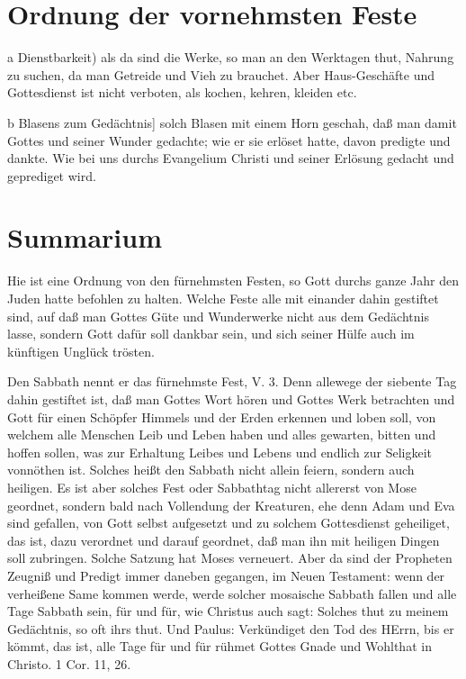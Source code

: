 \section{Ordnung der vornehmsten Feste}

a Dienstbarkeit) als da sind die Werke, so man an den Werktagen thut, Nahrung zu suchen, da man Getreide und Vieh zu brauchet. Aber Haus-Geschäfte und Gottesdienst ist nicht verboten, als kochen, kehren, kleiden etc.

b Blasens zum Gedächtnis] solch Blasen mit einem Horn geschah, daß man damit Gottes und seiner Wunder gedachte; wie er sie erlöset hatte, davon predigte und dankte. Wie bei uns durchs Evangelium Christi und seiner Erlösung gedacht und geprediget wird.

\section{Summarium}

Hie ist eine Ordnung von den fürnehmsten Festen, so Gott durchs ganze Jahr den Juden hatte befohlen zu halten. Welche Feste alle mit einander dahin gestiftet sind, auf daß man Gottes Güte und Wunderwerke nicht aus dem Gedächtnis lasse, sondern Gott dafür soll dankbar sein, und sich seiner Hülfe auch im künftigen Unglück trösten.

Den Sabbath nennt er das fürnehmste Fest, V. 3. Denn allewege der siebente Tag dahin gestiftet ist, daß man Gottes Wort hören und Gottes Werk betrachten und Gott für einen Schöpfer Himmels und der Erden erkennen und loben soll, von welchem alle Menschen Leib und Leben haben und alles gewarten, bitten und hoffen sollen, was zur Erhaltung Leibes und Lebens und endlich zur Seligkeit vonnöthen ist. Solches heißt den Sabbath nicht allein feiern, sondern auch heiligen. Es ist aber solches Fest oder Sabbathtag nicht allererst von Mose geordnet, sondern bald nach Vollendung der Kreaturen, ehe denn Adam und Eva sind gefallen, von Gott selbst aufgesetzt und zu solchem Gottesdienst geheiliget, das ist, dazu verordnet und darauf geordnet, daß man ihn mit heiligen Dingen soll zubringen. Solche Satzung hat Moses verneuert. Aber da sind der Propheten Zeugniß und Predigt immer daneben gegangen, im Neuen Testament: wenn der verheißene Same kommen werde, werde solcher mosaische Sabbath fallen und alle Tage Sabbath sein, für und für, wie Christus auch sagt: Solches thut zu meinem Gedächtnis, so oft ihrs thut. Und Paulus: Verkündiget den Tod des HErrn, bis er kömmt, das ist, alle Tage für und für rühmet Gottes Gnade und Wohlthat in Christo. 1 Cor. 11, 26.

